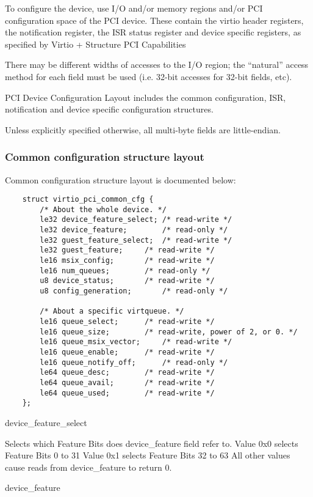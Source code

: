 To configure the device,
use I/O and/or memory regions and/or PCI configuration space of the PCI device.
These contain the virtio header registers, the notification register, the
ISR status register and device specific registers, as specified by Virtio
+ Structure PCI Capabilities

There may be different widths of accesses to the I/O region; the
“natural” access method for each field must be
used (i.e. 32-bit accesses for 32-bit fields, etc).

PCI Device Configuration Layout includes the common configuration,
ISR, notification and device specific configuration
structures.

Unless explicitly specified otherwise, all multi-byte fields are little-endian.

\subsubsection{Common configuration structure layout}\label{sec:Virtio Transport Options / Virtio Over PCI Bus / PCI Device Layout / Common configuration structure layout}
Common configuration structure layout is documented below:

\begin{lstlisting}
	struct virtio_pci_common_cfg {
		/* About the whole device. */
		le32 device_feature_select;	/* read-write */
		le32 device_feature;		/* read-only */
		le32 guest_feature_select;	/* read-write */
		le32 guest_feature;		/* read-write */
		le16 msix_config;		/* read-write */
		le16 num_queues;		/* read-only */
		u8 device_status;		/* read-write */
		u8 config_generation;		/* read-only */

		/* About a specific virtqueue. */
		le16 queue_select;		/* read-write */
		le16 queue_size;		/* read-write, power of 2, or 0. */
		le16 queue_msix_vector;		/* read-write */
		le16 queue_enable;		/* read-write */
		le16 queue_notify_off;		/* read-only */
		le64 queue_desc;		/* read-write */
		le64 queue_avail;		/* read-write */
		le64 queue_used;		/* read-write */
	};
\end{lstlisting}

device_feature_select

        Selects which Feature Bits does device_feature field refer to.
        Value 0x0 selects Feature Bits 0 to 31
        Value 0x1 selects Feature Bits 32 to 63
        All other values cause reads from device_feature to return 0.

device_feature

